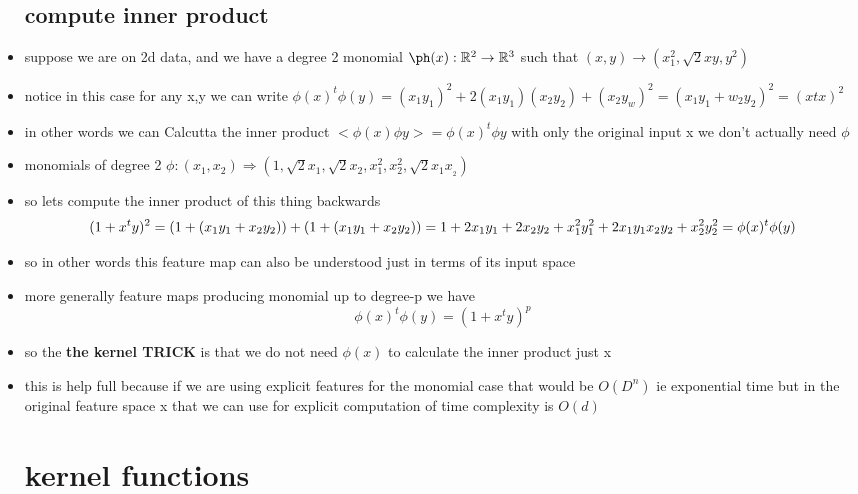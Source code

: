 \documentclass{article}
\begin{document}
\begin{itemize}
\subsection{compute inner product}
\item suppose we are on 2d data, and we have a degree 2 monomial $\ph(x):\mathbb{R}^{2}\rightarrow \mathbb{R}^{3}$ such that $(x,y)\rightarrow (x_1^2, \sqrt{2}xy,y^2)$
\item notice in this case for any x,y we can write $\phi(x)^t\phi(y)=(x_1y_1)^2+2(x_1y_1)(x_2y_2)+(x_2y_w)^2=(x_1y_1+w_2y_2)^2=(x{t}x)^{2}$
\item in other words we can Calcutta the inner product $<\phi(x)\phi{y}>=\phi(x)^{t}\phi{y}$ with only the original input x we don't actually need $\phi$
\item monomials of degree 2 $
\phi:(x_1,x_2)\Rightarrow (1,\sqrt{2}x_1, \sqrt{2}x_2, x_1^2 , x_2^2, \sqrt{2}x_1x__2)$
\item so lets compute the inner product of this thing backwards $$(1+x^{t}y)^2=(1+(x_1y_1+x_2y_2))+(1+(x_1y_1+x_2y_2))=1+2x_1y_1+2x_2y_2+x_1^2y_1^2+2x_1y_1x_2y_2+x_2^2y_2^2\\=\phi(x)^t\phi(y)$$
\item so in other words this feature map can also be understood just in terms of its input space 
\item more generally feature maps producing monomial up to degree-p we have $$\phi(x)^{t}\phi(y)=(1+x^ty)^{p}$$
\item  so the \textbf{the kernel TRICK} is that we do not need $\phi(x)$ to calculate the inner product just x
\item this is help full because if we are using explicit features for the monomial case that would be $O(D^{n})$ ie exponential time but in the original feature space x that we can use for explicit computation of time complexity is $O(d)$
\section{kernel functions}

\end{itemize}
\end{document}
